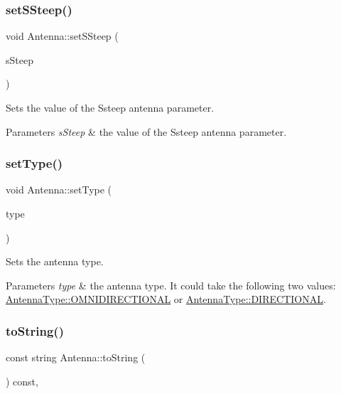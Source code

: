 \subsubsection{\texorpdfstring{set\+S\+Steep()}{setSSteep()}}
{\footnotesize\ttfamily void Antenna\+::set\+S\+Steep (\begin{DoxyParamCaption}\item[{double}]{s\+Steep }\end{DoxyParamCaption})}

Sets the value of the Ssteep antenna parameter. 
\begin{DoxyParams}{Parameters}
{\em s\+Steep} & the value of the Ssteep antenna parameter. \\
\hline
\end{DoxyParams}
\mbox{\label{class_antenna_aa9a8414c469e6dd49eed7a7cc58725c1}} 
\subsubsection{\texorpdfstring{set\+Type()}{setType()}}
{\footnotesize\ttfamily void Antenna\+::set\+Type (\begin{DoxyParamCaption}\item[{\hyperlink{_antenna_type_8h_a7b678b5cb9dedc607131200119d96b16}{Antenna\+Type}}]{type }\end{DoxyParamCaption})}

Sets the antenna type. 
\begin{DoxyParams}{Parameters}
{\em type} & the antenna type. It could take the following two values\+: \hyperlink{_antenna_type_8h_a7b678b5cb9dedc607131200119d96b16a8ff57fa72952e98025e600a041b8b8de}{Antenna\+Type\+::\+O\+M\+N\+I\+D\+I\+R\+E\+C\+T\+I\+O\+N\+AL} or \hyperlink{_antenna_type_8h_a7b678b5cb9dedc607131200119d96b16ab6f2249394a4def60a78b342dcc925b9}{Antenna\+Type\+::\+D\+I\+R\+E\+C\+T\+I\+O\+N\+AL}. \\
\hline
\end{DoxyParams}
\mbox{\label{class_antenna_a7fea30e065f49a3cbcee02f60bd033c8}} 
\subsubsection{\texorpdfstring{to\+String()}{toString()}}
{\footnotesize\ttfamily const string Antenna\+::to\+String (\begin{DoxyParamCaption}{ }\end{DoxyParamCaption}) const\hspace{0.3cm}{\ttfamily [override]}, {\ttfamily [virtual]}}

